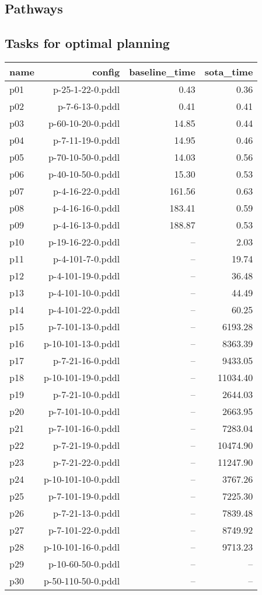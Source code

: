 \documentclass{article}
\begin{document}
                \newpage \subsection{Pathways}
                    \subsection*{Tasks for optimal planning}
                    
                            \begin{center}
                            \scriptsize
                            \begin{tabular}{@{}l|r|r|r@{}}
                            name & config & baseline\_time & sota\_time\\\midrule
                              p01& p-25-1-22-0.pddl&0.43&0.36\\
  p02& p-7-6-13-0.pddl&0.41&0.41\\
  p03& p-60-10-20-0.pddl&14.85&0.44\\
  p04& p-7-11-19-0.pddl&14.95&0.46\\
  p05& p-70-10-50-0.pddl&14.03&0.56\\
  p06& p-40-10-50-0.pddl&15.30&0.53\\
  p07& p-4-16-22-0.pddl&161.56&0.63\\
  p08& p-4-16-16-0.pddl&183.41&0.59\\
  p09& p-4-16-13-0.pddl&188.87&0.53\\
  p10& p-19-16-22-0.pddl&--&2.03\\
  p11& p-4-101-7-0.pddl&--&19.74\\
  p12& p-4-101-19-0.pddl&--&36.48\\
  p13& p-4-101-10-0.pddl&--&44.49\\
  p14& p-4-101-22-0.pddl&--&60.25\\
  p15& p-7-101-13-0.pddl&--&6193.28\\
  p16& p-10-101-13-0.pddl&--&8363.39\\
  p17& p-7-21-16-0.pddl&--&9433.05\\
  p18& p-10-101-19-0.pddl&--&11034.40\\
  p19& p-7-21-10-0.pddl&--&2644.03\\
  p20& p-7-101-10-0.pddl&--&2663.95\\
  p21& p-7-101-16-0.pddl&--&7283.04\\
  p22& p-7-21-19-0.pddl&--&10474.90\\
  p23& p-7-21-22-0.pddl&--&11247.90\\
  p24& p-10-101-10-0.pddl&--&3767.26\\
  p25& p-7-101-19-0.pddl&--&7225.30\\
  p26& p-7-21-13-0.pddl&--&7839.48\\
  p27& p-7-101-22-0.pddl&--&8749.92\\
  p28& p-10-101-16-0.pddl&--&9713.23\\
  p29& p-10-60-50-0.pddl&--&--\\
  p30& p-50-110-50-0.pddl&--&--
                            \end{tabular}
                            \end{center}
                    
\end{document}
